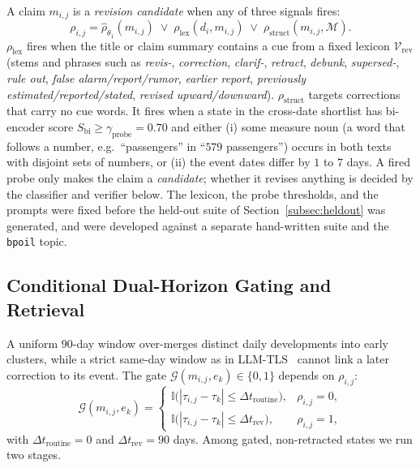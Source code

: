 \documentclass[journal]{IEEEtran}
\begin{document}
A claim $m_{i,j}$ is a \emph{revision candidate} when any of three signals fires:
\begin{equation}
\rho_{i,j} = \hat\rho_{\theta_1}(m_{i,j}) \;\lor\; \rho_{\text{lex}}(d_i, m_{i,j}) \;\lor\; \rho_{\text{struct}}(m_{i,j}, \mathcal{M}).
\label{eq:rev_cue}
\end{equation}
$\rho_{\text{lex}}$ fires when the title or claim summary contains a cue from a fixed lexicon $\mathcal{V}_{\text{rev}}$ (stems and phrases such as \textit{revis-}, \textit{correction}, \textit{clarif-}, \textit{retract}, \textit{debunk}, \textit{supersed-}, \textit{rule out}, \textit{false alarm/report/rumor}, \textit{earlier report}, \textit{previously estimated/reported/stated}, \textit{revised upward/downward}). $\rho_{\text{struct}}$ targets corrections that carry no cue words. It fires when a state in the cross-date shortlist has bi-encoder score $S_{\text{bi}}\ge\gamma_{\text{probe}}=0.70$ and either (i) some measure noun (a word that follows a number, e.g.\ ``passengers'' in ``$579$ passengers'') occurs in both texts with disjoint sets of numbers, or (ii) the event dates differ by $1$ to $7$ days. A fired probe only makes the claim a \emph{candidate}; whether it revises anything is decided by the classifier and verifier below. The lexicon, the probe thresholds, and the prompts were fixed before the held-out suite of Section~\ref{subsec:heldout} was generated, and were developed against a separate hand-written suite and the \texttt{bpoil} topic.

\subsection{Conditional Dual-Horizon Gating and Retrieval}
\label{subsec:retrieval}

A uniform $90$-day window over-merges distinct daily developments into early clusters, while a strict same-day window as in LLM-TLS~\cite{hu2024moments} cannot link a later correction to its event. The gate $\mathcal{G}(m_{i,j},e_k)\in\{0,1\}$ depends on $\rho_{i,j}$:
\begin{equation}
\mathcal{G}(m_{i,j}, e_k) = \begin{cases}
\mathbb{I}\big( |\tau_{i,j} - \tau_k| \le \Delta t_{\text{routine}} \big), & \rho_{i,j} = 0, \\[2pt]
\mathbb{I}\big( |\tau_{i,j} - \tau_k| \le \Delta t_{\text{rev}} \big), & \rho_{i,j} = 1,
\end{cases}
\label{eq:temporal_gate}
\end{equation}
with $\Delta t_{\text{routine}}=0$ and $\Delta t_{\text{rev}}=90$ days. Among gated, non-retracted states we run two stages.
\end{document}
